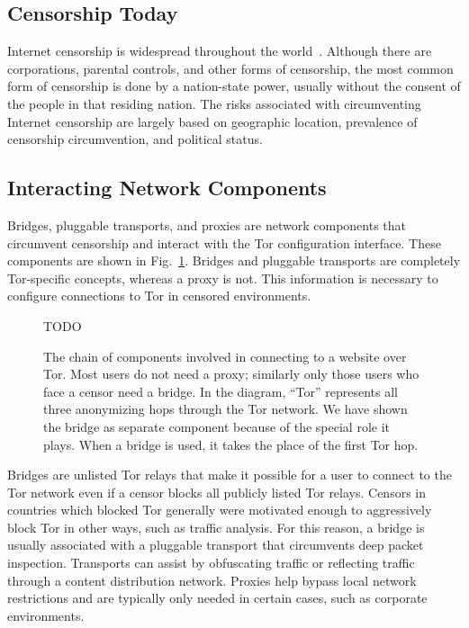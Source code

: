 \documentclass[USenglish,oneside,twocolumn]{article}
\begin{document}
\subsection{Censorship Today} 
Internet censorship is widespread throughout the world~\cite{faris2008measuring}. Although there are corporations, parental controls, and other forms of censorship, the most common form of censorship is done by a nation-state power, usually without the consent of the people in that residing nation. The risks associated with circumventing Internet censorship are largely based on geographic location, prevalence of censorship circumvention, and political status. 

\subsection{Interacting Network Components} 
Bridges, pluggable transports, and proxies are network components that 
circumvent censorship and interact with the Tor configuration interface. 
These components are shown in Fig.~\ref{fig:topology}.
Bridges and pluggable transports are completely Tor-specific concepts, whereas a proxy is not.  
This information is necessary to configure connections to Tor in censored environments. 

\begin{figure}
\centering
{\color {red} TODO}
\caption{
The chain of components involved in connecting to a website over Tor.
Most users do not need a proxy;
similarly only those users who face a censor need a bridge.
In the diagram, ``Tor'' represents all three anonymizing hops through the Tor network.
We have shown the bridge as separate component
because of the special role it plays.
When a bridge is used, it takes the place of the first Tor hop.
}
\label{fig:topology}
\end{figure}

Bridges are unlisted Tor relays that make it possible for a user to connect
to the Tor network even if a censor blocks all publicly listed Tor relays. 
Censors in countries which blocked Tor generally were motivated enough to aggressively
block Tor in other ways, such as traffic analysis. For this reason, a bridge is usually associated
with a pluggable transport that circumvents deep packet inspection. Transports can
assist by obfuscating traffic or reflecting traffic through a content distribution network. 
Proxies help bypass local network restrictions and are typically only
needed in certain cases, such as corporate environments.
\end{document}
